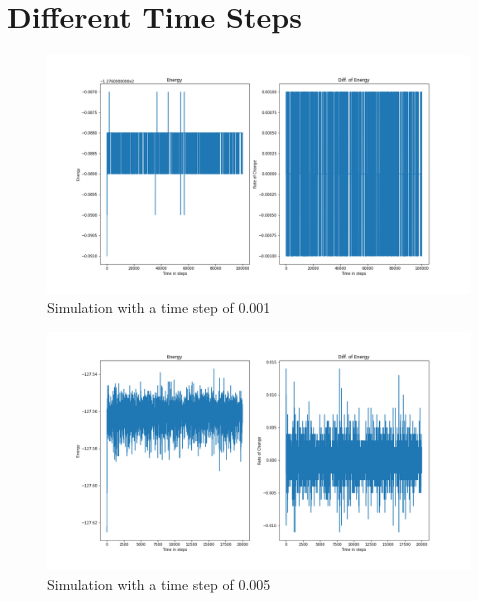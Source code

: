 \section{Different Time Steps}
\begin{figure}[!h]
	\begin{center}
		\includegraphics[scale=1]{Figure/plot_001.png}
	\end{center}
	\caption[Simulation]{Simulation with a time step of 0.001}
	\label{Plot001}
\end{figure}
\begin{figure}[!h]
	\begin{center}
		\includegraphics[scale= 1]{Figure/plot_005.png}
	\end{center}
	\caption[Simulation]{Simulation with a time step of 0.005}
	\label{Plot005}
\end{figure}
